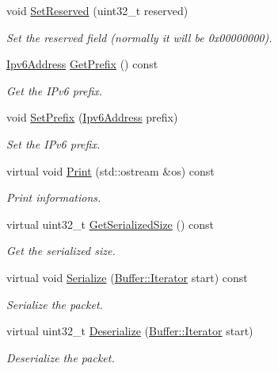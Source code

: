 \begin{DoxyCompactItemize}
void \hyperlink{classns3_1_1Icmpv6OptionPrefixInformation_a204f5b5d78296ec975cf6a07b866d756}{Set\+Reserved} (uint32\+\_\+t reserved)
\begin{DoxyCompactList}\small\item\em Set the reserved field (normally it will be 0x00000000). \end{DoxyCompactList}\item 
\hyperlink{classns3_1_1Ipv6Address}{Ipv6\+Address} \hyperlink{classns3_1_1Icmpv6OptionPrefixInformation_a51070efcc8e1edf16ac14489bd1d1151}{Get\+Prefix} () const 
\begin{DoxyCompactList}\small\item\em Get the I\+Pv6 prefix. \end{DoxyCompactList}\item 
void \hyperlink{classns3_1_1Icmpv6OptionPrefixInformation_a3b8d5080ea33c4a9711f1c6caab2b990}{Set\+Prefix} (\hyperlink{classns3_1_1Ipv6Address}{Ipv6\+Address} prefix)
\begin{DoxyCompactList}\small\item\em Set the I\+Pv6 prefix. \end{DoxyCompactList}\item 
virtual void \hyperlink{classns3_1_1Icmpv6OptionPrefixInformation_ada5fc70162fe6d3f40f6a30801b3e9aa}{Print} (std\+::ostream \&os) const 
\begin{DoxyCompactList}\small\item\em Print informations. \end{DoxyCompactList}\item 
virtual uint32\+\_\+t \hyperlink{classns3_1_1Icmpv6OptionPrefixInformation_a417e636721bc0ac79b5fea11f8b8e7ea}{Get\+Serialized\+Size} () const 
\begin{DoxyCompactList}\small\item\em Get the serialized size. \end{DoxyCompactList}\item 
virtual void \hyperlink{classns3_1_1Icmpv6OptionPrefixInformation_a4c498867c73398d9958aea86ff3ac4f7}{Serialize} (\hyperlink{classns3_1_1Buffer_1_1Iterator}{Buffer\+::\+Iterator} start) const 
\begin{DoxyCompactList}\small\item\em Serialize the packet. \end{DoxyCompactList}\item 
virtual uint32\+\_\+t \hyperlink{classns3_1_1Icmpv6OptionPrefixInformation_a3b88da9dc8b4d1c75b4c89e8d7954f83}{Deserialize} (\hyperlink{classns3_1_1Buffer_1_1Iterator}{Buffer\+::\+Iterator} start)
\begin{DoxyCompactList}\small\item\em Deserialize the packet. \end{DoxyCompactList}\end{DoxyCompactItemize}
